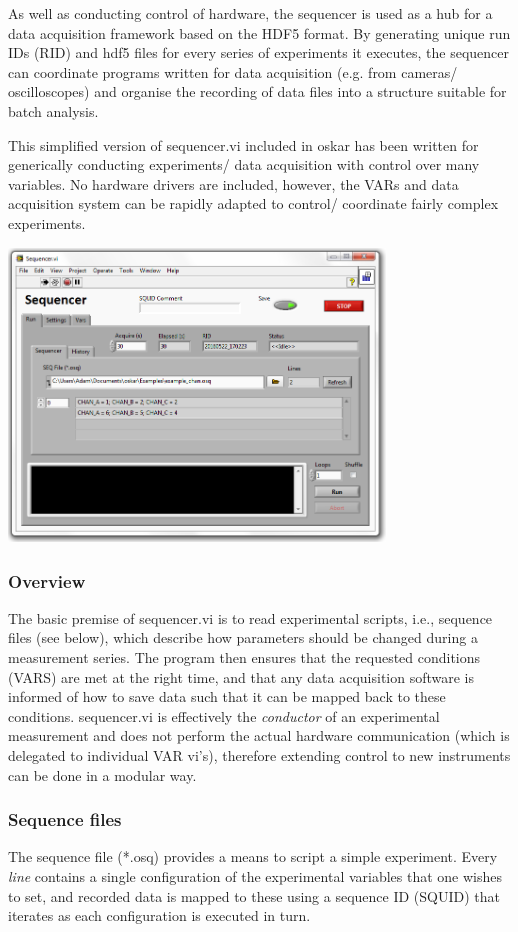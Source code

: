 \documentclass[10pt,a4paper]{article}
\begin{document}
As well as conducting control of hardware, the sequencer is used as a hub for a data acquisition framework based on the HDF5 format.  By generating unique run IDs (RID) and hdf5 files for every series of experiments it executes, the sequencer can coordinate programs written for data acquisition (e.g. from cameras/ oscilloscopes) and organise the recording of data files into a structure suitable for batch analysis.

This simplified version of sequencer.vi included in oskar has been written for generically conducting experiments/ data acquisition with control over many variables.   No hardware drivers are included, however, the VARs and data acquisition system can be rapidly adapted to control/ coordinate fairly complex experiments.

\includegraphics[width=0.75\textwidth]{images/sequencer.png}

\subsubsection{Overview}

The basic premise of sequencer.vi is to read experimental scripts, i.e., sequence files (see below), which describe how parameters should be changed during a measurement series.  The program then ensures that the requested conditions (VARS) are met at the right time, and that any data acquisition software is informed of how to save data such that it can be mapped back to these conditions.  sequencer.vi is effectively the \emph{conductor} of an experimental measurement and does not perform the actual hardware communication (which is delegated to individual VAR vi's), therefore extending control to new instruments can be done in a modular way.

\subsubsection{Sequence files}
The sequence file (*.osq) provides a means to script a simple experiment. Every \emph{line} contains a single configuration of the experimental variables that one wishes to set, and recorded data is mapped to these using a sequence ID (SQUID) that iterates as each configuration is executed in turn.
\end{document}
